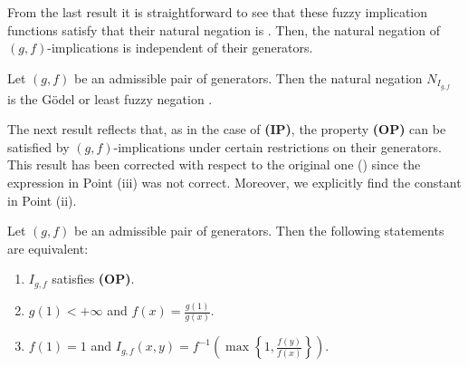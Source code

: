 From the last result it is straightforward to see that these fuzzy implication functions satisfy that their natural negation is \NDOne. Then, the natural negation of $(g,f)$-implications is independent of their generators.

\begin{corollary} Let $(g,f)$ be an admissible pair of generators. Then the natural negation $N_{I_{g,f}}$ is the G\"odel or least fuzzy negation \NDOne.
	\label{negationgf}
\end{corollary}

The next result reflects that, as in the case of {\bf (IP)}, the property {\bf (OP)} can be satisfied by $(g,f)$-implications under certain restrictions on their generators. This result has been corrected with respect to the original one 
(\cite[Proposition 11]{Massanet2013B}) since the expression in Point (iii) was not correct. Moreover, we explicitly find the constant in Point (ii).

\begin{proposition}\label{prop:(g,f)(OP)} 
Let $(g,f)$ be an admissible pair of generators. Then the following statements are equivalent:
	\begin{enumerate}[label=(\roman*)]
		\item $I_{g,f}$ satisfies {\bf (OP)}.
		\item $g(1) < + \infty $ and $f(x) = \frac{g(1)}{g(x)}$.
		\item $f(1)=1$ and $I_{g,f}(x,y)=f^{-1}\left(\max \left\lbrace 1, \frac{f(y)}{f(x)} \right\rbrace \right)$.
	\end{enumerate}
\end{proposition}

